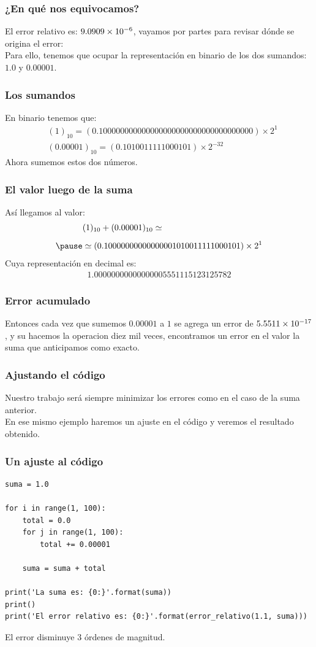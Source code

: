 \documentclass[12pt]{beamer}
\begin{document}
\begin{frame}
\frametitle{¿En qué nos equivocamos?}
El error relativo es: $\num{9.0909d-6}$, \pause vayamos por partes para revisar dónde se origina el error:
\\
\bigskip
\pause
Para ello, tenemos que ocupar la representación en binario de los dos sumandos: $1.0$ y $0.00001$.
\end{frame}
\begin{frame}
\frametitle{Los sumandos}
En binario tenemos que:
\pause
\begin{align*}
{}&(1)_{10} = (0.1000 0000 0000 0000 0000 0000 0000 0000 0000) \times 2^{1} \\
{}&(0.00001)_{10} = (0.1010011111000101) \times 2^{-32}
\end{align*}
\pause
Ahora sumemos estos dos números.
\end{frame}
\begin{frame}
\frametitle{El valor luego de la suma}
Así llegamos al valor:
\pause
\begin{eqnarray*}
{}&(1)_{10} + (0.00001)_{10} \simeq \\[0.5em] \pause
&\simeq (0.10000000000000001010011111000101) \times 2^{1}
\end{eqnarray*}
\pause
Cuya representación en decimal es:
\pause
\begin{align*}
1.00000000000000005551115123125782
\end{align*}
\end{frame}
\begin{frame}
\frametitle{Error acumulado}
Entonces cada vez que sumemos $0.00001$ a $1$ se agrega un error de $\num{5.5511d-17}$, \pause y su hacemos la operacion diez mil veces, \pause encontramos un error en el valor la suma que anticipamos como exacto. 
\end{frame}
\begin{frame}
\frametitle{Ajustando el código}
Nuestro trabajo será siempre minimizar los errores como en el caso de la suma anterior.
\\
\bigskip
\pause
En ese mismo ejemplo haremos un ajuste en el código y veremos el resultado obtenido.
\end{frame}
\begin{frame}
\frametitle{Un ajuste al código}
\begin{lstlisting}[caption=Una agrupación en la suma]
suma = 1.0

for i in range(1, 100):
    total = 0.0
    for j in range(1, 100):
        total += 0.00001
    
    suma = suma + total

print('La suma es: {0:}'.format(suma))
print()
print('El error relativo es: {0:}'.format(error_relativo(1.1, suma)))
\end{lstlisting}
\pause
El error disminuye $3$ órdenes de magnitud.
\end{frame}
\end{document}
